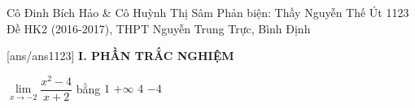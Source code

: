 \begin{name}
{Cô Đinh Bích Hảo \& Cô Huỳnh Thị Sâm \newline 
Phản biện: Thầy Nguyễn Thế Út }
{1123 Đề HK2 (2016-2017), THPT Nguyễn Trung Trực, Bình Định}
	\end{name}
	\setcounter{ex}{0}\setcounter{bt}{0}
	[ans/ans1123]
\noindent\textbf{I. PHẦN TRẮC NGHIỆM}
\begin{ex}%
	$\displaystyle \lim \limits_{x \to -2} \dfrac{x^2-4}{x+2}$ bằng
	\choice
	{$1 $}
	{ $ +\infty$}
	{ $4 $}
	{\True $-4 $}
\end{ex}

